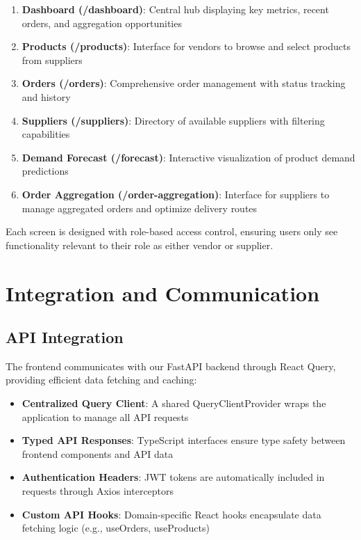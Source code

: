 \begin{enumerate}
    \item \textbf{Dashboard (/dashboard)}: Central hub displaying key metrics, recent orders, and aggregation opportunities
    \item \textbf{Products (/products)}: Interface for vendors to browse and select products from suppliers
    \item \textbf{Orders (/orders)}: Comprehensive order management with status tracking and history
    \item \textbf{Suppliers (/suppliers)}: Directory of available suppliers with filtering capabilities
    \item \textbf{Demand Forecast (/forecast)}: Interactive visualization of product demand predictions
    \item \textbf{Order Aggregation (/order-aggregation)}: Interface for suppliers to manage aggregated orders and optimize delivery routes
\end{enumerate}

Each screen is designed with role-based access control, ensuring users only see functionality relevant to their role as either vendor or supplier.

\section{Integration and Communication}

\subsection{API Integration}

The frontend communicates with our FastAPI backend through React Query, providing efficient data fetching and caching:

\begin{itemize}
    \item \textbf{Centralized Query Client}: A shared QueryClientProvider wraps the application to manage all API requests
    \item \textbf{Typed API Responses}: TypeScript interfaces ensure type safety between frontend components and API data
    \item \textbf{Authentication Headers}: JWT tokens are automatically included in requests through Axios interceptors
    \item \textbf{Custom API Hooks}: Domain-specific React hooks encapsulate data fetching logic (e.g., useOrders, useProducts)
\end{itemize}

